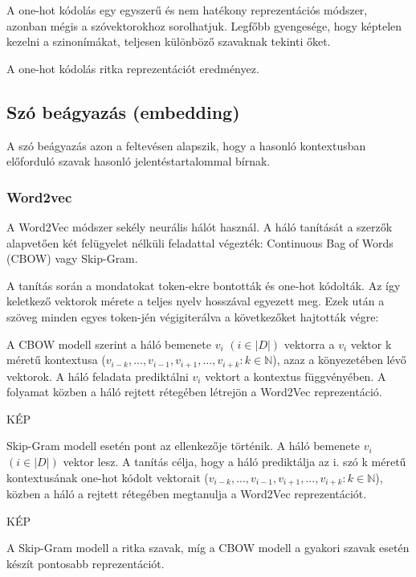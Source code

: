 A one-hot kódolás egy egyszerű és nem hatékony reprezentációs módszer, azonban mégis a szóvektorokhoz sorolhatjuk. Legfőbb gyengesége, hogy képtelen kezelni a szinonímákat, teljesen különböző szavaknak tekinti őket.

\begin{note}
	A one-hot kódolás ritka reprezentációt eredményez.
\end{note}

\subsection{Szó beágyazás (embedding)}

A szó beágyazás azon a feltevésen alapszik, hogy a hasonló kontextusban előforduló szavak hasonló jelentéstartalommal bírnak.

\subsubsection{Word2vec}
A Word2Vec módszer sekély neurális hálót használ. A háló tanítását a szerzők alapvetően két felügyelet nélküli feladattal végezték: Continuous Bag of Words (CBOW) vagy Skip-Gram.

A tanítás során a mondatokat token-ekre bontották és one-hot kódolták. Az így keletkező vektorok mérete a teljes nyelv hosszával egyezett meg. Ezek után a szöveg minden egyes token-jén végigiterálva a következőket hajtották végre:

A CBOW modell szerint a háló bemenete $v_i$
$\left( i \in \left|D\right| \right)$ vektorra a $v_i$ vektor k méretű kontextusa ($v_{i-k},...,v_{i-1}, v_{i+1},..., v_{i+k} : k \in \mathbb{N}$), azaz a könyezetében lévő vektorok. A háló feladata prediktálni $v_i$ vektort a kontextus függvényében. A folyamat közben a háló rejtett rétegében létrejön a Word2Vec reprezentáció.

KÉP

Skip-Gram modell esetén pont az ellenkezője történik. A háló bemenete $v_i$
$\left( i \in \left|D\right| \right)$ vektor lesz. A tanítás célja, hogy a háló prediktálja az i. szó k méretű kontextusának one-hot kódolt vektorait ($v_{i-k},...,v_{i-1}, v_{i+1},..., v_{i+k} : k \in \mathbb{N}$), közben a háló a rejtett rétegében megtanulja a Word2Vec reprezentációt.

KÉP

\begin{note}
	A Skip-Gram modell a ritka szavak, míg a CBOW modell a gyakori szavak esetén készít pontosabb reprezentációt.
\end{note}


